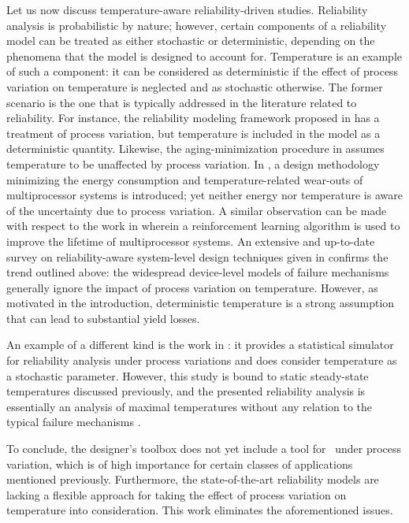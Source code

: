Let us now discuss temperature-aware reliability-driven studies.
Reliability analysis is probabilistic by nature; however, certain components of a reliability model can be treated as either stochastic or deterministic, depending on the phenomena that the model is designed to account for.
Temperature is an example of such a component: it can be considered as deterministic if the effect of process variation on temperature is neglected and as stochastic otherwise.
The former scenario is the one that is typically addressed in the literature related to reliability.
For instance, the reliability modeling framework proposed in \cite{xiang2010} has a treatment of process variation, but temperature is included in the model as a deterministic quantity.
Likewise, the aging-minimization procedure in \cite{ukhov2012} assumes temperature to be unaffected by process variation.
In \cite{das2014a}, a design methodology minimizing the energy consumption and temperature-related wear-outs of multiprocessor systems is introduced; yet neither energy nor temperature is aware of the uncertainty due to process variation.
A similar observation can be made with respect to the work in \cite{das2014c} wherein a reinforcement learning algorithm is used to improve the lifetime of multiprocessor systems.
An extensive and up-to-date survey on reliability-aware system-level design techniques given in \cite{das2014b} confirms the trend outlined above: the widespread device-level models of failure mechanisms generally ignore the impact of process variation on temperature.
However, as motivated in the introduction, deterministic temperature is a strong assumption that can lead to substantial yield losses.

An example of a different kind is the work in \cite{lee2013}: it provides a statistical simulator for reliability analysis under process variations and does consider temperature as a stochastic parameter.
However, this study is bound to static steady-state temperatures discussed previously, and the presented reliability analysis is essentially an analysis of maximal temperatures without any relation to the typical failure mechanisms \cite{jedec}.

To conclude, the designer's toolbox does not yet include a tool for \dssta\ under process variation, which is of high importance for certain classes of applications mentioned previously.
Furthermore, the state-of-the-art reliability models are lacking a flexible approach for taking the effect of process variation on temperature into consideration.
This work eliminates the aforementioned issues.
